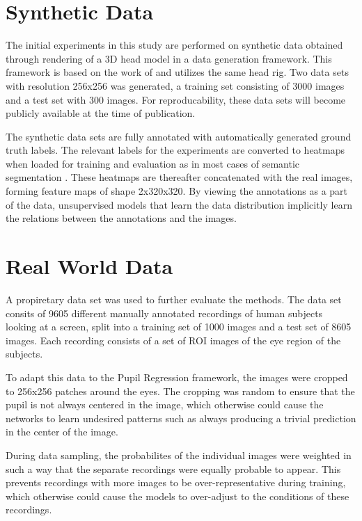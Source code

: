 \section{Synthetic Data}
The initial experiments in this study are performed on synthetic data obtained through rendering of a 3D head model in a data generation framework. This framework is based on the work of \textcite{swirski2014rendering} and utilizes the same head rig. Two data sets with resolution 256x256 was generated, a training set consisting of 3000 images and a test set with 300 images. For reproducability, these data sets will become publicly available at the time of publication.

The synthetic data sets are fully annotated with automatically generated ground truth labels. The relevant labels for the experiments are converted to heatmaps when loaded for training and evaluation as in most cases of semantic segmentation \parencite{guo2017review}. These heatmaps are thereafter concatenated with the real images, forming feature maps of shape 2x320x320. By viewing the annotations as a part of the data, unsupervised models that learn the data distribution implicitly learn the relations between the annotations and the images.

\section{Real World Data}
A propiretary data set was used to further evaluate the methods. The data set consits of 9605 different manually annotated recordings of human subjects looking at a screen, split into a training set of 1000 images and a test set of 8605 images. Each recording consists of a set of ROI images of the eye region of the subjects. 

To adapt this data to the Pupil Regression framework, the images were cropped to 256x256 patches around the eyes. The cropping was random to ensure that the pupil is not always centered in the image, which otherwise could cause the networks to learn undesired patterns such as always producing a trivial prediction in the center of the image. 

During data sampling, the probabilites of the individual images were weighted in such a way that the separate recordings were equally probable to appear. This prevents recordings with more images to be over-representative during training, which otherwise could cause the models to over-adjust to the conditions of these recordings.


